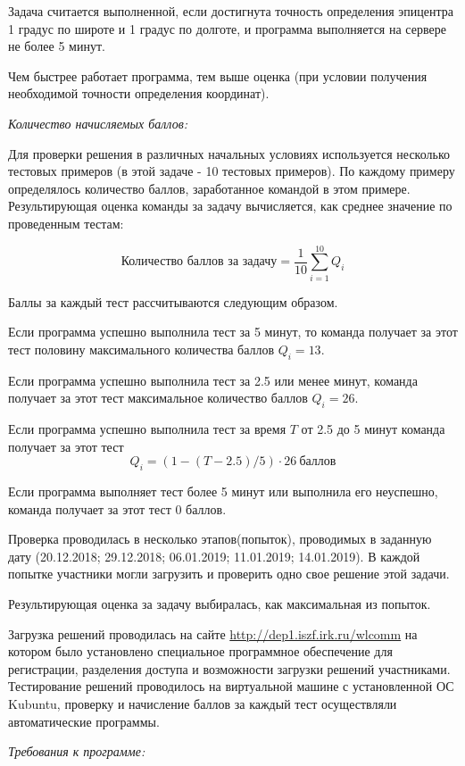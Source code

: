 \markSection

Задача считается выполненной, если достигнута точность определения эпицентра 1 градус по широте и 1 градус по долготе, и программа выполняется на сервере не более 5 минут.

Чем быстрее работает программа, тем выше оценка (при условии получения необходимой точности определения координат).

\textit{Количество начисляемых баллов:}

Для проверки решения в различных начальных условиях используется несколько тестовых примеров (в этой задаче - 10 тестовых примеров). По каждому примеру определялось количество баллов, заработанное командой в этом примере. Результирующая оценка команды за задачу вычисляется, как среднее значение по проведенным тестам:

$$\text{Количество баллов за задачу} = \frac{1}{10} \sum_{i = 1}^{10} Q_i$$

Баллы за каждый тест рассчитываются следующим образом.

Если программа успешно выполнила тест за 5 минут, то команда получает за этот тест половину максимального количества баллов $Q_i = 13$.

Если программа успешно выполнила тест за 2.5 или менее минут, команда получает  за этот тест максимальное количество баллов $Q_i = 26$.

Если программа успешно выполнила тест за время $T$ от 2.5 до 5 минут команда получает   за этот тест
$$ Q_i=(1-(T-2.5)/5) \cdot 26 \: \text{баллов}$$

Если программа выполняет тест более 5 минут или выполнила его неуспешно,  команда получает  за этот тест 0 баллов.

Проверка проводилась в несколько этапов(попыток), проводимых в заданную дату (20.12.2018; 29.12.2018; 06.01.2019; 11.01.2019; 14.01.2019). В каждой попытке участники могли загрузить и проверить одно свое решение этой задачи.

Результирующая оценка за задачу выбиралась, как максимальная из попыток.

Загрузка решений проводилась на сайте \url{http://dep1.iszf.irk.ru/wlcomm} на котором было установлено специальное программное обеспечение для регистрации, разделения доступа и возможности загрузки решений участниками.
Тестирование решений проводилось на виртуальной машине с установленной ОС Kubuntu, проверку и начисление баллов за каждый тест осуществляли автоматические программы.

\textit{Требования к программе:}


